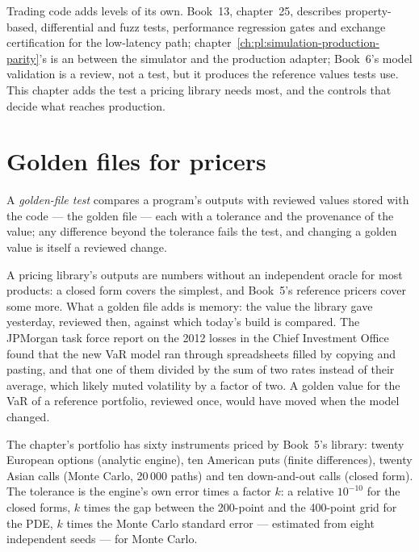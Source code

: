 Trading code adds levels of its own. Book~13, chapter~25, describes property-based, differential and fuzz tests, performance regression gates
and exchange certification for the low-latency path; chapter~\ref{ch:pl:simulation-production-parity}'s  is an 
between the simulator and the production adapter; Book~6's model validation is a review, not a test, but it produces the reference values tests
use. This chapter adds the test a pricing library needs most, and the controls that decide what reaches production.

\section{Golden files for pricers}

\begin{definition}\label{def:pl:testing-and-continuous-delivery:golden}
A \emph{golden-file test} compares a program's outputs with reviewed values stored with the code --- the golden
file --- each with a tolerance and the provenance of the value; any difference beyond the tolerance fails the test, and changing a golden value
is itself a reviewed change.
\end{definition}

A pricing library's outputs are numbers without an independent oracle for most products: a closed form covers the simplest, and Book~5's
reference pricers cover some more. What a golden file adds is memory: the value the library gave yesterday, reviewed then, against which
today's build is compared. The JPMorgan task force report on the 2012 losses in the Chief Investment Office found that the new VaR model ran
through spreadsheets filled by copying and pasting, and that one of them divided by the sum of two rates instead of their average, which
likely muted volatility by a factor of two. A golden value for the VaR of a reference portfolio, reviewed once, would have moved when the
model changed.

The chapter's portfolio has sixty instruments priced by Book~5's library: twenty European options (analytic engine), ten American puts
(finite differences), twenty Asian calls (Monte Carlo, 20\,000 paths) and ten down-and-out calls (closed form). The tolerance is the engine's
own error times a factor $k$: a relative $10^{-10}$ for the closed forms, $k$ times the gap between the 200-point and the 400-point grid for
the PDE, $k$ times the Monte Carlo standard error --- estimated from eight independent seeds --- for Monte Carlo.

